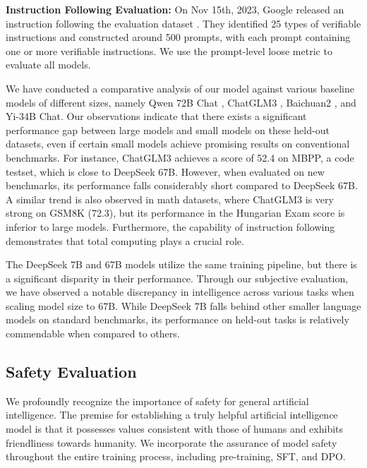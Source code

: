 \textbf{Instruction Following Evaluation: } On Nov 15th, 2023, Google released an instruction following the evaluation dataset \citep{IFeval}. They identified 25 types of verifiable instructions and constructed around 500 prompts, with each prompt containing one or more verifiable instructions. We use the prompt-level loose metric to evaluate all models. 

We have conducted a comparative analysis of our model against various baseline models of different sizes, namely Qwen 72B Chat \citep{qwen}, ChatGLM3 \citep{glm}, Baichuan2 \citep{baichuan2}, and Yi-34B Chat. Our observations indicate that there exists a significant performance gap between large models and small models on these held-out datasets, even if certain small models achieve promising results on conventional benchmarks. For instance, ChatGLM3 achieves a score of 52.4 on MBPP, a code testset, which is close to DeepSeek 67B. However, when evaluated on new benchmarks, its performance falls considerably short compared to  DeepSeek 67B. A similar trend is also observed in math datasets, where ChatGLM3 is very strong on GSM8K (72.3), but its performance in the Hungarian Exam score is inferior to large models. Furthermore, the capability of instruction following demonstrates that total computing plays a crucial role. 

The DeepSeek 7B and 67B models utilize the same training pipeline, but there is a significant disparity in their performance. Through our subjective evaluation, we have observed a notable discrepancy in intelligence across various tasks when scaling model size to 67B. While DeepSeek 7B falls behind other smaller language models on standard benchmarks, its performance on held-out tasks is relatively commendable when compared to others.

\subsection{Safety Evaluation} We profoundly recognize the importance of safety for general artificial intelligence. The premise for establishing a truly helpful artificial intelligence model is that it possesses values consistent with those of humans and exhibits friendliness towards humanity. We incorporate the assurance of model safety throughout the entire training process, including pre-training, SFT, and DPO.


